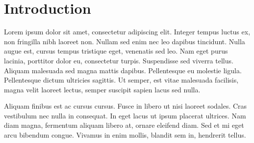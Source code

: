 \section{Introduction}
	Lorem ipsum dolor sit amet, consectetur adipiscing elit. Integer tempus luctus ex, non fringilla nibh laoreet non. Nullam sed enim nec leo dapibus tincidunt. Nulla augue est, cursus tempus tristique eget, venenatis sed leo. Nam eget purus lacinia, porttitor dolor eu, consectetur turpis. Suspendisse sed viverra tellus. Aliquam malesuada sed magna mattis dapibus. Pellentesque eu molestie ligula. Pellentesque dictum ultricies sagittis. Ut semper, est vitae malesuada facilisis, magna velit laoreet lectus, semper suscipit sapien lacus sed nulla.

	Aliquam finibus est ac cursus cursus. Fusce in libero ut nisi laoreet sodales. Cras vestibulum nec nulla in consequat. In eget lacus ut ipsum placerat ultrices. Nam diam magna, fermentum aliquam libero at, ornare eleifend diam. Sed et mi eget arcu bibendum congue. Vivamus in enim mollis, blandit sem in, hendrerit tellus.



















